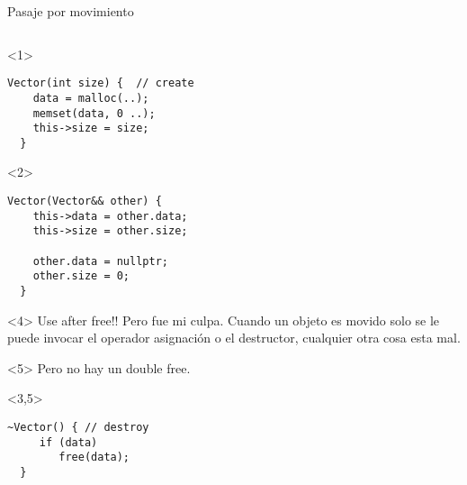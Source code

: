 \begin{frame}[fragile]{Pasaje por movimiento}
\begin{columns}[T]
\begin{column}{.5\linewidth}
        \begin{onlyenv}<1>
        \begin{lstlisting}[style=normal,firstnumber=5]
  Vector(int size) {  // create
    data = malloc(..);
    memset(data, 0 ..);
    this->size = size;
  }
        \end{lstlisting}
        \end{onlyenv}
        \begin{onlyenv}<2>
        \begin{lstlisting}[style=normal,firstnumber=5]
  Vector(Vector&& other) {
    this->data = other.data;
    this->size = other.size;

    other.data = nullptr;
    other.size = 0;
  }
        \end{lstlisting}
        \end{onlyenv}
        \begin{onlyenv}<4>
Use after free!! Pero fue mi culpa. Cuando un objeto es movido solo se le puede invocar el operador asignaci\'on o el destructor, cualquier otra cosa esta mal.
        \end{onlyenv}
        \begin{onlyenv}<5>
Pero no hay un double free.
        \end{onlyenv}
        \begin{visibleenv}<3,5>
        \begin{lstlisting}[style=normal,firstnumber=10]
  ~Vector() { // destroy
     if (data)
        free(data);
  }
        \end{lstlisting}
        \end{visibleenv}
                   ~%
      \end{column}
   \end{columns}
\end{frame}

